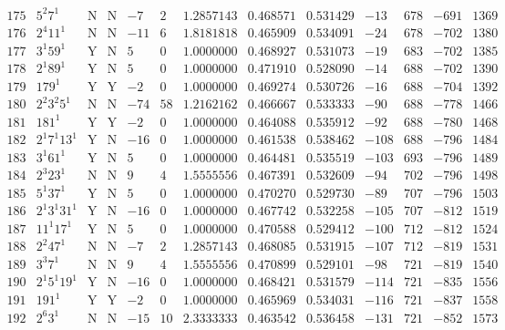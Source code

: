 \documentclass[11pt,reqno,a4letter]{article}
\numberwithin{equation}{section}
\numberwithin{figure}{section}
\numberwithin{table}{section}
\theoremstyle{plain}
\numberwithin{theorem}{section}
\theoremstyle{definition}
\begin{document}
\begin{table}[ht]
\begin{equation*}
{\begin{array}{cc|cc|ccc|cc|cccc}
 175 & 5^2 7^1 & \text{N} & \text{N} & -7 & 2 & 1.2857143 & 0.468571 & 0.531429 & -13 & 678 & -691 & 1369 \\
 176 & 2^4 11^1 & \text{N} & \text{N} & -11 & 6 & 1.8181818 & 0.465909 & 0.534091 & -24 & 678 & -702 & 1380 \\
 177 & 3^1 59^1 & \text{Y} & \text{N} & 5 & 0 & 1.0000000 & 0.468927 & 0.531073 & -19 & 683 & -702 & 1385 \\
 178 & 2^1 89^1 & \text{Y} & \text{N} & 5 & 0 & 1.0000000 & 0.471910 & 0.528090 & -14 & 688 & -702 & 1390 \\
 179 & 179^1 & \text{Y} & \text{Y} & -2 & 0 & 1.0000000 & 0.469274 & 0.530726 & -16 & 688 & -704 & 1392 \\
 180 & 2^2 3^2 5^1 & \text{N} & \text{N} & -74 & 58 & 1.2162162 & 0.466667 & 0.533333 & -90 & 688 & -778 & 1466 \\
 181 & 181^1 & \text{Y} & \text{Y} & -2 & 0 & 1.0000000 & 0.464088 & 0.535912 & -92 & 688 & -780 & 1468 \\
 182 & 2^1 7^1 13^1 & \text{Y} & \text{N} & -16 & 0 & 1.0000000 & 0.461538 & 0.538462 & -108 & 688 & -796 & 1484 \\
 183 & 3^1 61^1 & \text{Y} & \text{N} & 5 & 0 & 1.0000000 & 0.464481 & 0.535519 & -103 & 693 & -796 & 1489 \\
 184 & 2^3 23^1 & \text{N} & \text{N} & 9 & 4 & 1.5555556 & 0.467391 & 0.532609 & -94 & 702 & -796 & 1498 \\
 185 & 5^1 37^1 & \text{Y} & \text{N} & 5 & 0 & 1.0000000 & 0.470270 & 0.529730 & -89 & 707 & -796 & 1503 \\
 186 & 2^1 3^1 31^1 & \text{Y} & \text{N} & -16 & 0 & 1.0000000 & 0.467742 & 0.532258 & -105 & 707 & -812 & 1519 \\
 187 & 11^1 17^1 & \text{Y} & \text{N} & 5 & 0 & 1.0000000 & 0.470588 & 0.529412 & -100 & 712 & -812 & 1524 \\
 188 & 2^2 47^1 & \text{N} & \text{N} & -7 & 2 & 1.2857143 & 0.468085 & 0.531915 & -107 & 712 & -819 & 1531 \\
 189 & 3^3 7^1 & \text{N} & \text{N} & 9 & 4 & 1.5555556 & 0.470899 & 0.529101 & -98 & 721 & -819 & 1540 \\
 190 & 2^1 5^1 19^1 & \text{Y} & \text{N} & -16 & 0 & 1.0000000 & 0.468421 & 0.531579 & -114 & 721 & -835 & 1556 \\
 191 & 191^1 & \text{Y} & \text{Y} & -2 & 0 & 1.0000000 & 0.465969 & 0.534031 & -116 & 721 & -837 & 1558 \\
 192 & 2^6 3^1 & \text{N} & \text{N} & -15 & 10 & 2.3333333 & 0.463542 & 0.536458 & -131 & 721 & -852 & 1573 \\

\end{array}}
\end{equation*}
\end{table}
\end{document}
